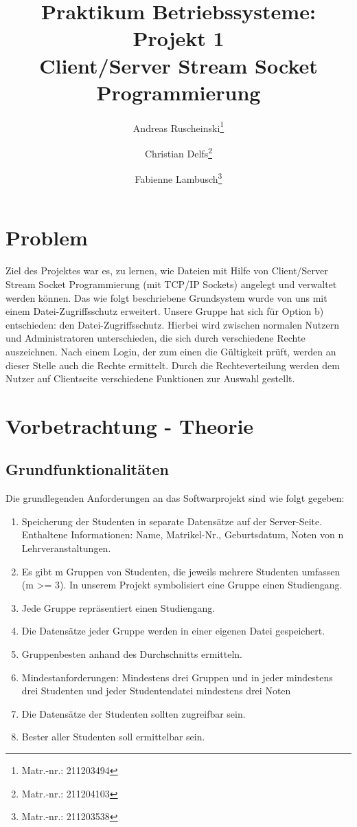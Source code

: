 \documentclass{scrartcl}
\title{Praktikum Betriebssysteme: Projekt 1\\ Client/Server Stream Socket Programmierung}
\author{Andreas Ruscheinski\thanks{Matr.-nr.: 211203494}\and Christian Delfs\thanks{Matr.-nr.: 211204103}\and Fabienne Lambusch\thanks{Matr.-nr.: 211203538}}
\begin{document}
\maketitle
\tableofcontents

\section{Problem}
	Ziel des Projektes war es, zu lernen, wie Dateien mit Hilfe von Client/Server Stream Socket Programmierung (mit TCP/IP Sockets) angelegt und verwaltet werden können. Das wie folgt beschriebene Grundsystem wurde von uns mit einem Datei-Zugriffsschutz erweitert. 
	Unsere Gruppe hat sich für Option b) entschieden: den Datei-Zugriffsschutz. Hierbei wird zwischen normalen Nutzern und Administratoren unterschieden, die sich durch verschiedene Rechte auszeichnen. Nach einem Login, der zum einen die Gültigkeit prüft, werden an dieser Stelle auch die Rechte ermittelt. Durch die Rechteverteilung werden dem Nutzer auf Clientseite verschiedene Funktionen zur Auswahl gestellt.\\

\section{Vorbetrachtung - Theorie}
	\subsection{Grundfunktionalitäten}
		Die grundlegenden Anforderungen an das Softwarprojekt sind wie folgt gegeben:
		\begin{enumerate}
		\item Speicherung der Studenten in separate Datensätze auf der Server-Seite. Enthaltene Informationen: Name, Matrikel-Nr., Geburtsdatum, Noten von n
		Lehrveranstaltungen.
		\item Es gibt m Gruppen von Studenten, die jeweils mehrere Studenten umfassen (m >= 3). In unserem Projekt symbolisiert eine Gruppe einen Studiengang.
		\item Jede Gruppe repräsentiert einen Studiengang.
		\item Die Datensätze jeder Gruppe werden in einer eigenen Datei gespeichert.
		\item Gruppenbesten anhand des Durchschnitts ermitteln.
		\item Mindestanforderungen: Mindestens drei Gruppen und in jeder mindestens drei Studenten und jeder Studentendatei mindestens drei Noten
		\item Die Datensätze der Studenten sollten zugreifbar sein.
		\item Bester aller Studenten soll ermittelbar sein.
		
		\end{enumerate}
\end{document}
